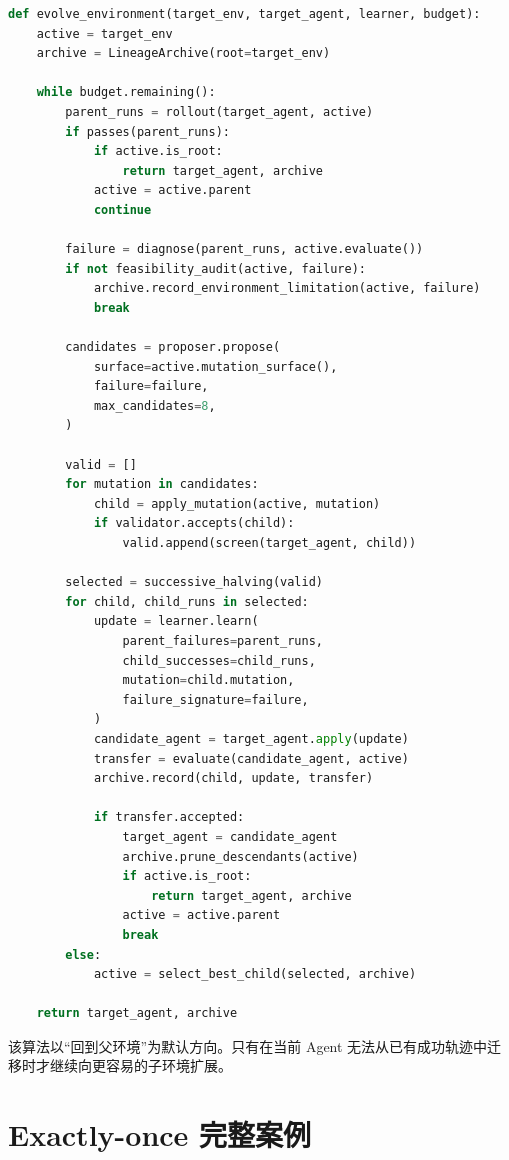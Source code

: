 \documentclass[11pt,a4paper,fontset=fandol]{ctexart}
\begin{document}
\begin{lstlisting}[language=Python]
def evolve_environment(target_env, target_agent, learner, budget):
    active = target_env
    archive = LineageArchive(root=target_env)

    while budget.remaining():
        parent_runs = rollout(target_agent, active)
        if passes(parent_runs):
            if active.is_root:
                return target_agent, archive
            active = active.parent
            continue

        failure = diagnose(parent_runs, active.evaluate())
        if not feasibility_audit(active, failure):
            archive.record_environment_limitation(active, failure)
            break

        candidates = proposer.propose(
            surface=active.mutation_surface(),
            failure=failure,
            max_candidates=8,
        )

        valid = []
        for mutation in candidates:
            child = apply_mutation(active, mutation)
            if validator.accepts(child):
                valid.append(screen(target_agent, child))

        selected = successive_halving(valid)
        for child, child_runs in selected:
            update = learner.learn(
                parent_failures=parent_runs,
                child_successes=child_runs,
                mutation=child.mutation,
                failure_signature=failure,
            )
            candidate_agent = target_agent.apply(update)
            transfer = evaluate(candidate_agent, active)
            archive.record(child, update, transfer)

            if transfer.accepted:
                target_agent = candidate_agent
                archive.prune_descendants(active)
                if active.is_root:
                    return target_agent, archive
                active = active.parent
                break
        else:
            active = select_best_child(selected, archive)

    return target_agent, archive
\end{lstlisting}

该算法以“回到父环境”为默认方向。只有在当前 Agent 无法从已有成功轨迹中迁移时才继续向更容易的子环境扩展。

\section{Exactly-once 完整案例}
\end{document}
